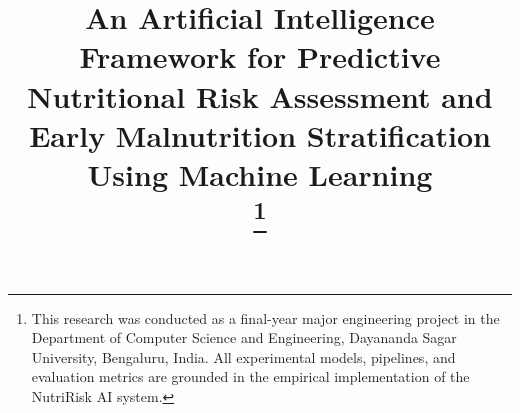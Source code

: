 \documentclass[conference]{IEEEtran}
\begin{document}
\title{An Artificial Intelligence Framework for Predictive Nutritional Risk Assessment and Early Malnutrition Stratification Using Machine Learning\\
\thanks{This research was conducted as a final-year major engineering project in the Department of Computer Science and Engineering, Dayananda Sagar University, Bengaluru, India. All experimental models, pipelines, and evaluation metrics are grounded in the empirical implementation of the NutriRisk AI system.}
}

\author{
}

\maketitle
\end{document}
